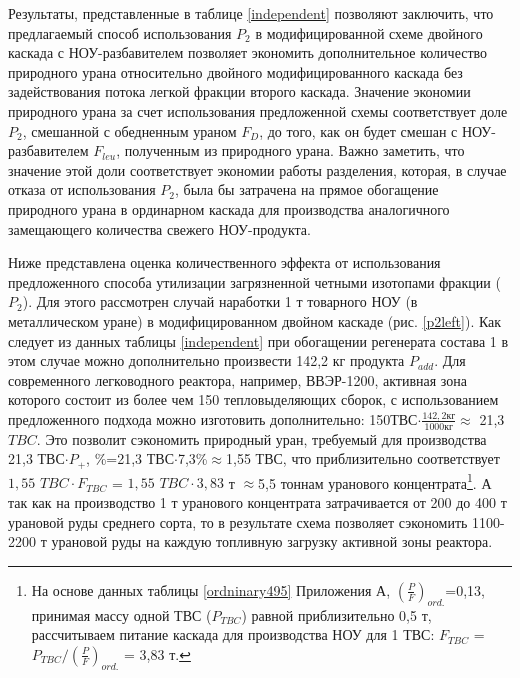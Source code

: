 Результаты, представленные в таблице \ref{independent} позволяют заключить, что предлагаемый способ использования $P_2$ в модифицированной схеме двойного каскада с НОУ-разбавителем позволяет экономить дополнительное количество природного урана относительно двойного модифицированного каскада без задействования потока легкой фракции второго каскада. Значение экономии природного урана за счет использования предложенной схемы соответствует доле $P_2$, смешанной с обедненным ураном $F_D$, до того, как он будет смешан с НОУ-разбавителем $F_{leu}$, полученным из природного урана. Важно заметить, что значение этой доли соответствует экономии работы разделения, которая, в случае отказа от использования $P_2$, была бы затрачена на прямое обогащение природного урана в ординарном каскада для производства аналогичного замещающего количества свежего НОУ-продукта.

Ниже представлена оценка количественного эффекта от использования предложенного способа утилизации загрязненной четными изотопами фракции ($P_2$). Для этого рассмотрен случай наработки 1 т товарного НОУ (в металлическом уране) в модифицированном двойном каскаде (рис. \ref{p2left}). Как следует из данных таблицы \ref{independent} при обогащении регенерата состава 1 в этом случае можно дополнительно произвести 142,2 кг продукта $P_{add}$. Для современного легководного реактора, например, ВВЭР-1200, активная зона которого состоит из более чем 150 тепловыделяющих сборок, с использованием предложенного подхода можно изготовить дополнительно: 150$ $ТВС$\cdot \frac{142,2 \textit{кг}}{1000 \textit{кг}}\approx$ 21,3 $TBC$. Это позволит сэкономить природный уран, требуемый для производства 21,3 ТВС$\cdot P_{+}$, \%=21,3 ТВС$\cdot$7,3\%$\approx$1,55 ТВС, что приблизительно соответствует $1,55$  $TBC \cdot F_{TBC}$ = $1,55$ $TBC\cdot 3,83$ т $\approx$5,5 тоннам уранового концентрата\footnote{На основе данных таблицы \ref{ordninary495} Приложения А, $(\frac{P}{F})_{ord.}$=0,13,  принимая массу одной ТВС ($P_{TBC}$) равной приблизительно 0,5 т, рассчитываем питание каскада для производства НОУ для 1 ТВС: $F_{TBC}$ = $P_{TBC}/(\frac{P}{F})_{ord.}$ = 3,83 т.}. А так как на производство 1 т уранового концентрата затрачивается от 200 до 400 т урановой руды \cite{bekmanYaDERNAYaFIZIKA} среднего сорта, то в результате схема позволяет сэкономить 1100-2200 т урановой руды на каждую топливную загрузку активной зоны реактора.


